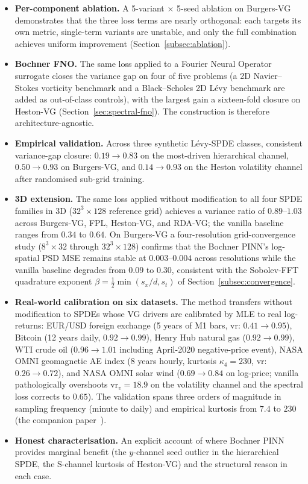 \documentclass[review,12pt]{elsarticle}
\begin{document}
\begin{itemize}
\item \textbf{Per-component ablation.} A 5-variant \(\times\) 5-seed
ablation on Burgers-VG demonstrates that the three loss terms are
nearly orthogonal: each targets its own metric, single-term
variants are unstable, and only the full combination achieves
uniform improvement (Section~\ref{subsec:ablation}).

\item \textbf{Bochner FNO.} The same loss applied to a
Fourier Neural Operator surrogate closes the variance gap on four
of five problems (a 2D Navier--Stokes vorticity benchmark and a
Black--Scholes 2D L\'evy benchmark are added as out-of-class
controls), with the largest gain a sixteen-fold closure on
Heston-VG (Section~\ref{sec:spectral-fno}). The construction is
therefore architecture-agnostic.

\item \textbf{Empirical validation.} Across three synthetic L\'evy-SPDE
classes, consistent variance-gap closure: \(0.19 \to 0.83\) on the
most-driven hierarchical channel, \(0.50 \to 0.93\) on Burgers-VG,
and \(0.14 \to 0.93\) on the Heston volatility channel after
randomised sub-grid training.

\item \textbf{3D extension.} The same loss applied without modification
to all four SPDE families in 3D (\(32^3 \times 128\) reference grid)
achieves a variance ratio of \(0.89\)--\(1.03\) across Burgers-VG, FPL,
Heston-VG, and RDA-VG; the vanilla baseline ranges from \(0.34\) to
\(0.64\). On Burgers-VG a four-resolution grid-convergence study
(\(8^3 \times 32\) through \(32^3 \times 128\)) confirms that the
Bochner PINN's log-spatial PSD MSE remains stable at \(0.003\)--\(0.004\)
across resolutions while the vanilla baseline degrades from \(0.09\) to
\(0.30\), consistent with the Sobolev-FFT quadrature exponent
\(\beta = \tfrac12 \min(s_x/d, s_t)\) of Section~\ref{subsec:convergence}.

\item \textbf{Real-world calibration on six datasets.} The method
transfers without modification to SPDEs whose VG drivers are
calibrated by MLE to real log-returns: EUR/USD foreign exchange (5
years of M1 bars, vr: \(0.41 \to 0.95\)), Bitcoin (12 years daily,
\(0.92 \to 0.99\)), Henry Hub natural gas (\(0.92 \to 0.99\)), WTI
crude oil (\(0.96 \to 1.01\) including April-2020 negative-price
event), NASA OMNI geomagnetic AE index (8 years hourly, kurtosis
\(\kappa_4 = 230\), vr: \(0.26 \to 0.72\)), and NASA OMNI solar wind
(\(0.69 \to 0.84\) on log-price; vanilla pathologically overshoots
\(\mathrm{vr}_v = 18.9\) on the volatility channel and the spectral
loss corrects to \(0.65\)). The validation spans three orders of
magnitude in sampling frequency (minute to daily) and empirical
kurtosis from \(7.4\) to \(230\) (the companion paper~\citep{Lipski2026RealWorld}).

\item \textbf{Honest characterisation.} An explicit account of where
Bochner PINN provides marginal benefit (the \(y\)-channel seed
outlier in the hierarchical SPDE, the S-channel kurtosis of Heston-VG)
and the structural reason in each case.
\end{itemize}
\end{document}
